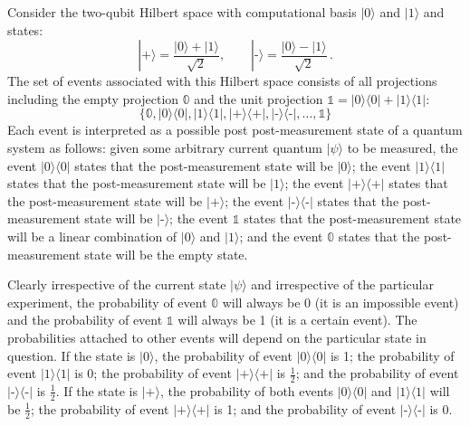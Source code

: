 \documentclass{article}
\theoremstyle{remark}
\newcommand{\ket}[1]{|#1\rangle}
\newcommand{\proj}[1]{|#1 \rangle\langle #1 |}
\newcommand{\ps}{\texttt{+}}
\newcommand{\ms}{\texttt{-}}
\begin{document}
Consider the two-qubit Hilbert space with computational basis
$\ket{0}$ and $\ket{1}$ and states:
\[
\ket{\ps}=\frac{\ket{0}+\ket{1}}{\sqrt{2}}, \qquad\ket{\ms}=\frac{\ket{0}-\ket{1}}{\sqrt{2}}\,.
\]
The set of events associated with this Hilbert space consists of all
projections including the empty projection $\mathbb{0}$ and the unit
projection $\mathbb{1} = \proj{0}+\proj{1}$:
\[ 
\{ \mathbb{0}, \proj{0}, \proj{1}, \proj{\ps}, \proj{\ms}, \ldots, \mathbb{1}\}
\]
Each event is interpreted as a possible post post-measurement state of
a quantum system as follows: given some arbitrary current quantum
$\ket{\psi}$ to be measured, the event $\proj{0}$ states that the
post-measurement state will be $\ket{0}$; the event $\proj{1}$ states
that the post-measurement state will be $\ket{1}$; the event
$\proj{\ps}$ states that the post-measurement state will be
$\ket{\ps}$; the event $\proj{\ms}$ states that the post-measurement
state will be $\ket{\ms}$; the event $\mathbb{1}$ states that the
post-measurement state will be a linear combination of $\ket{0}$ and
$\ket{1}$; and the event $\mathbb{0}$ states that the post-measurement
state will be the empty state.

Clearly irrespective of the current state $\ket{\psi}$ and
irrespective of the particular experiment, the probability of event
$\mathbb{0}$ will always be 0 (it is an impossible event) and the
probability of event $\mathbb{1}$ will always be 1 (it is a certain
event). The probabilities attached to other events will depend on the
particular state in question. If the state is $\ket{0}$, the
probability of event $\proj{0}$ is 1; the probability of event
$\proj{1}$ is 0; the probability of event $\proj{\ps}$ is
$\frac{1}{2}$; and the probability of event $\proj{\ms}$ is
$\frac{1}{2}$. If the state is $\ket{\ps}$, the probability of both
events $\proj{0}$ and $\proj{1}$ will be $\frac{1}{2}$; the
probability of event $\proj{\ps}$ is 1; and the probability of event
$\proj{\ms}$ is 0. 
\end{document}
